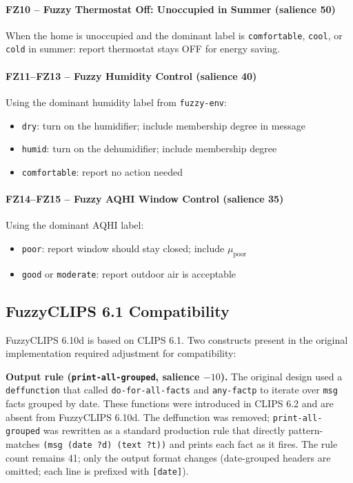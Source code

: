 \documentclass{article}
\begin{document}
\paragraph{FZ10 -- Fuzzy Thermostat Off: Unoccupied in Summer (salience 50)}
When the home is unoccupied and the dominant label is \texttt{comfortable}, \texttt{cool}, or \texttt{cold} in summer: report thermostat stays OFF for energy saving.

\paragraph{FZ11–FZ13 -- Fuzzy Humidity Control (salience 40)}
Using the dominant humidity label from \texttt{fuzzy-env}:
\begin{itemize}
    \item \texttt{dry}: turn on the humidifier; include membership degree in message
    \item \texttt{humid}: turn on the dehumidifier; include membership degree
    \item \texttt{comfortable}: report no action needed
\end{itemize}

\paragraph{FZ14–FZ15 -- Fuzzy AQHI Window Control (salience 35)}
Using the dominant AQHI label:
\begin{itemize}
    \item \texttt{poor}: report window should stay closed; include $\mu_{\text{poor}}$
    \item \texttt{good} or \texttt{moderate}: report outdoor air is acceptable
\end{itemize}

\subsection{FuzzyCLIPS 6.1 Compatibility}

FuzzyCLIPS 6.10d is based on CLIPS 6.1. Two constructs present in the original implementation required adjustment for compatibility:

\textbf{Output rule (\texttt{print-all-grouped}, salience $-10$).}
The original design used a \texttt{deffunction} that called \texttt{do-for-all-facts} and \texttt{any-factp} to iterate over \texttt{msg} facts grouped by date.
These functions were introduced in CLIPS 6.2 and are absent from FuzzyCLIPS 6.10d.
The deffunction was removed; \texttt{print-all-grouped} was rewritten as a standard production rule that directly pattern-matches \texttt{(msg (date ?d) (text ?t))} and prints each fact as it fires.
The rule count remains 41; only the output format changes (date-grouped headers are omitted; each line is prefixed with \texttt{[date]}).
\end{document}
